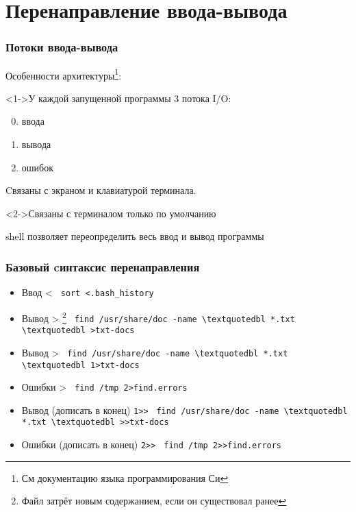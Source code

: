 \section{Перенаправление ввода-вывода}
\begin{frame}
  \frametitle{Потоки ввода-вывода}
  
  Особенности архитектуры\footnote{См документацию языка программирования Си}:
  \begin{block}<1->{У каждой запущенной программы 3 потока I/O:}
    \begin{enumerate}
      \setcounter{enumi}{-1}
      \item ввода
      \item вывода
      \item ошибок
    \end{enumerate}

    Cвязаны с экраном и клавиатурой терминала. \pause \newline
  \end{block}

  \begin{block}<2->{Связаны с терминалом только по умолчанию}

    \alert{shell позволяет переопределить весь ввод и вывод программы}
  \end{block}

\end{frame}

\begin{frame}[fragile]
  \frametitle{Базовый cинтаксис перенаправления}
  \begin{itemize}    
    \item \alert{Ввод} \textquotedbl < \textquotedbl \newline
      \verb+ sort <.bash_history+ \pause
    \item \alert{Вывод} \textquotedbl > \textquotedbl \footnote{Файл затрёт новым содержанием, если он существовал ранее} \newline
      \verb+ find /usr/share/doc -name \textquotedbl *.txt \textquotedbl >txt-docs+    
    \item \alert{Вывод} > \textquotedbl \newline
      \verb+ find /usr/share/doc -name \textquotedbl *.txt \textquotedbl 1>txt-docs+ \pause
    \item \alert{Ошибки} > \textquotedbl \newline
      \verb+ find /tmp 2>find.errors+ \pause
    \item \alert{Вывод (дописать в конец)} \textquotedbl \verb+1>>+ \textquotedbl \newline
      \verb+ find /usr/share/doc -name \textquotedbl *.txt \textquotedbl >>txt-docs+
    \item \alert{Ошибки (дописать в конец)} \textquotedbl \verb+2>>+ \textquotedbl \newline 
      \verb+ find /tmp 2>>find.errors+ \pause
  \end{itemize}
\end{frame}

